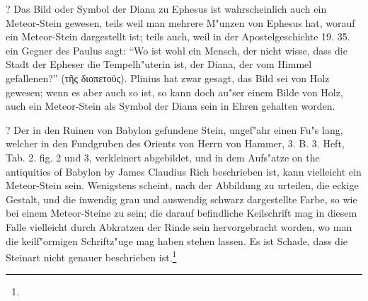 \documentclass[a4paper, 11pt, oneside, polutonikogreek, german]{article}
\begin{document}
? Das Bild oder Symbol der Diana zu Ephesus ist wahrscheinlich auch ein Meteor-Stein gewesen, teils weil man mehrere M"unzen von Ephesus hat, worauf ein Meteor-Stein dargestellt ist; teils auch, weil in der Apostelgeschichte 19. 35. ein Gegner des Paulus sagt: "`Wo ist wohl ein Mensch, der nicht wisse, dass die Stadt der Epheser die Tempelh"uterin ist, der Diana, der vom Himmel gefallenen?"' (τῆς διοπετοὑς). Plinius hat zwar gesagt, das Bild sei von Holz gewesen; wenn es aber auch so ist, so kann doch au"ser einem Bilde von Holz, auch ein Meteor-Stein als Symbol der Diana sein in Ehren gehalten worden.

? Der in den Ruinen von Babylon gefundene Stein, ungef"ahr einen Fu"s lang, welcher in den Fundgruben des Orients von Herrn von Hammer, 3. B. 3. Heft, Tab. 2. fig. 2 und 3, verkleinert abgebildet, und in dem Aufs"atze on the antiquities of Babylon by James Claudius Rich beschrieben ist, kann vielleicht ein Meteor-Stein sein. Wenigstens scheint, nach der Abbildung zu urteilen, die eckige Gestalt, und die inwendig grau und auswendig schwarz dargestellte Farbe, so wie bei einem Meteor-Steine zu sein; die darauf befindliche Keilschrift mag in diesem Falle vielleicht durch Abkratzen der Rinde sein hervorgebracht worden, wo man die keilf"ormigen Schriftz"uge mag haben stehen lassen. Es ist Schade, dass die Steinart nicht genauer beschrieben ist.\footnote{}
\end{document}
